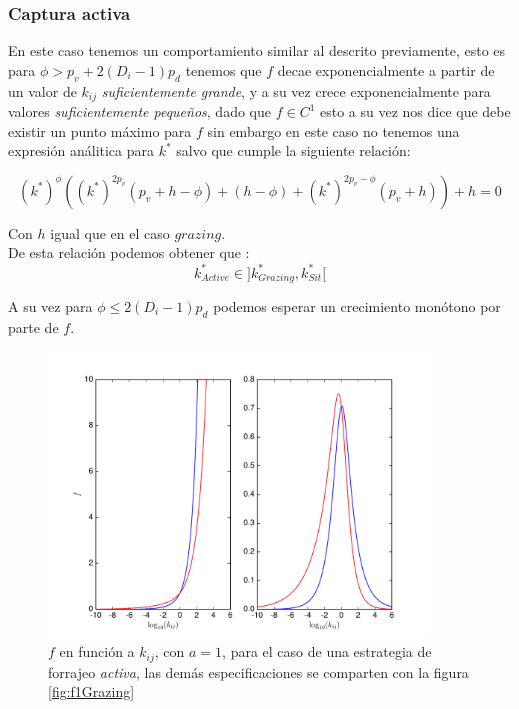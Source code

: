 \subsubsection{Captura activa}

En este caso tenemos un comportamiento similar al descrito previamente, esto es para $\phi > p_v + 2(D_i -1) p_d$ tenemos que $f$ decae exponencialmente a partir de un valor de $k_{ij}$ \emph{suficientemente grande}, y a su vez crece exponencialmente para valores \emph{suficientemente peque\~nos}, dado que $f \in C^1$ esto a su vez nos dice que debe existir un punto m\'aximo para $f$ sin embargo en este caso no tenemos una expresi\'on an\'alitica para $k^*$ salvo que cumple la siguiente relaci\'on:

\begin{equation}
  (k^*)^{\phi}((k^*)^{2p_v}(p_v+ h -\phi) + (h -\phi) + (k^*)^{2p_v - \phi}(p_v + h ) ) + h = 0
\end{equation}

Con $h$ igual que en el caso $grazing$.\\
De esta relaci\'on podemos obtener que :
\begin{equation}
  k^*_{Active} \in ] k^*_{Grazing} , k^*_{Sit} [
\end{equation}

A su vez para $\phi \leq 2(D_i - 1)p_d $ podemos esperar un crecimiento mon\'otono por parte de $f$. 

\begin{figure}
\begin{center}
 \includegraphics[width=0.9\textwidth]{./Plots/f1Active.pdf}
 \caption[$f_1, Active$]{$f$ en funci\'on a $k_{ij}$, con $a =1$, para el caso de una estrategia de forrajeo \emph{activa}, las dem\'as especificaciones se comparten con la figura \ref{fig:f1Grazing}}
 \label{fig:f1Active} 
\end{center}
\end{figure}

